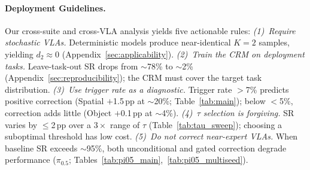 \paragraph{Deployment Guidelines.}
 Our cross-suite and cross-VLA analysis yields five actionable rules:
\textit{(1)~Require stochastic VLAs.} Deterministic models produce near-identical $K{=}2$ samples, yielding $d_2 \approx 0$ (Appendix~\ref{sec:applicability}).
\textit{(2)~Train the CRM on deployment tasks.} Leave-task-out SR drops from ${\sim}$78\% to ${\sim}$2\% (Appendix~\ref{sec:reproducibility}); the CRM must cover the target task distribution.
\textit{(3)~Use trigger rate as a diagnostic.} Trigger rate ${>}$7\% predicts positive correction (Spatial $+$1.5\,pp at ${\sim}$20\%; Table~\ref{tab:main}); below ${<}$5\%, correction adds little (Object $+$0.1\,pp at ${\sim}$4\%).
\textit{(4)~$\tau$ selection is forgiving.} SR varies by ${\leq}$2\,pp over a $3{\times}$ range of $\tau$ (Table~\ref{tab:tau_sweep}); choosing a suboptimal threshold has low cost.
\textit{(5)~Do not correct near-expert VLAs.} When baseline SR exceeds ${\sim}$95\%, both unconditional and gated correction degrade performance ($\pi_{0.5}$; Tables~\ref{tab:pi05_main},~\ref{tab:pi05_multiseed}).

